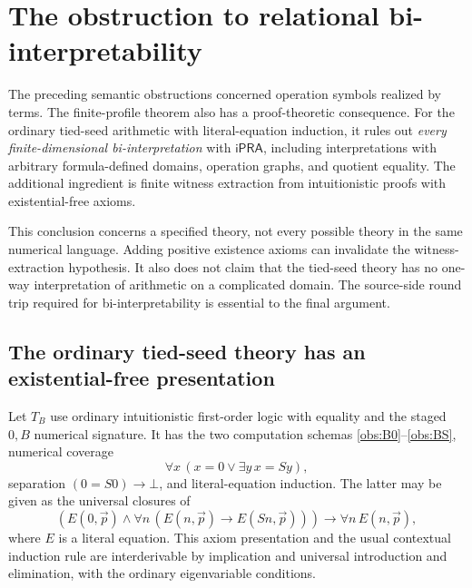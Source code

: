 
\section{The obstruction to relational bi-interpretability}
\label{sec:relational-obstruction}

The preceding semantic obstructions concerned operation symbols realized
by terms. The finite-profile theorem also has a proof-theoretic
consequence. For the ordinary tied-seed arithmetic with literal-equation
induction, it rules out \emph{every finite-dimensional
bi-interpretation} with $\mathsf{iPRA}$, including interpretations with
arbitrary formula-defined domains, operation graphs, and quotient
equality. The additional ingredient is finite witness extraction from
intuitionistic proofs with existential-free axioms.

This conclusion concerns a specified theory, not every possible theory
in the same numerical language. Adding positive existence axioms can
invalidate the witness-extraction hypothesis. It also does not claim
that the tied-seed theory has no one-way interpretation of arithmetic
on a complicated domain. The source-side round trip required for
bi-interpretability is essential to the final argument.

\subsection{The ordinary tied-seed theory has an existential-free presentation}

Let $T_B$ use ordinary intuitionistic first-order logic with equality and
the staged $0,B$ numerical signature. It has the two computation schemas
\eqref{obs:B0}--\eqref{obs:BS}, numerical coverage
\[
              \forall x\,(x=0\vee\exists y\,x=Sy),
\]
separation $(0=S0)\to\bot$, and literal-equation induction. The latter
may be given as the universal closures of
\[
 \left(E(0,\vec p)\wedge
       \forall n\,(E(n,\vec p)\to E(Sn,\vec p))\right)
       \longrightarrow\forall n\,E(n,\vec p),
 \tag{EI axiom}\label{rel:EI-axiom}
\]
where $E$ is a literal equation. This axiom presentation and the usual
contextual induction rule are interderivable by implication and
universal introduction and elimination, with the ordinary eigenvariable
conditions.

